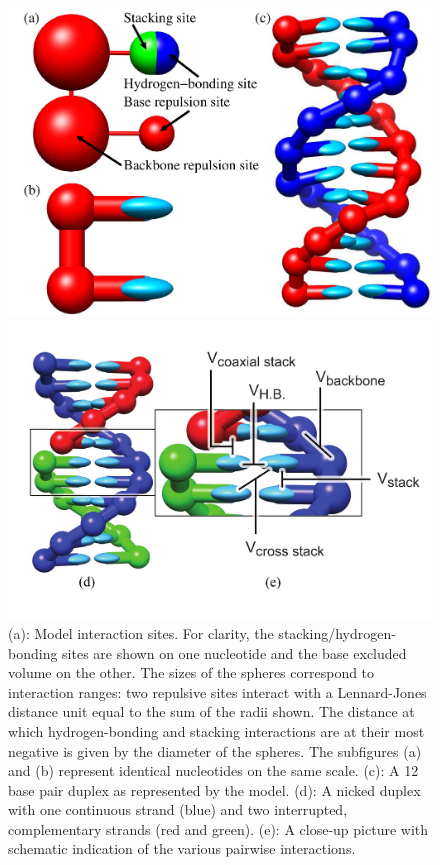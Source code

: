 \documentclass[12pt,onecolumn]{article}
\begin{document}
\begin{figure}[htpb]
\begin{center}
\begin{minipage}{0.4\textwidth}
\includegraphics[width=\textwidth]{./pics/the_model-eps-converted-to.pdf}
\end{minipage}
\begin{minipage}{0.5\textwidth}
\includegraphics[width=\textwidth]{./pics/oxDNA_nicked_duplex_interactions.pdf}
\end{minipage}
\caption{\label{model} (a): Model interaction sites. For clarity, the stacking/hydrogen-bonding sites are shown on one nucleotide and the base excluded volume on the other. The sizes of the spheres correspond to interaction ranges: two repulsive sites interact with a Lennard-Jones distance unit equal to the sum of the radii shown. The distance at which hydrogen-bonding and stacking interactions are at their most negative is given by the diameter of the spheres. The subfigures (a) and (b) represent identical nucleotides on the same scale. (c): A 12 base pair duplex as represented by the model. (d): A nicked duplex with one continuous strand (blue) and two interrupted, complementary strands (red and green). (e): A close-up picture with schematic indication of the various pairwise interactions.}
\end{center}
\end{figure}
\end{document}
